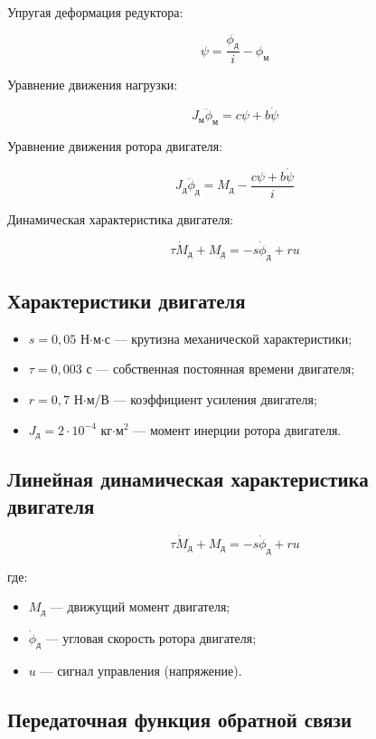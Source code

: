 \documentclass[14pt]{extreport}
\begin{document}
{Упругая деформация редуктора:

\[
\psi = \frac{\phi_{\text{д}}}{i} - \phi_{\text{м}}
\]

Уравнение движения нагрузки:

\[
J_{\text{м}} \ddot{\phi}_{\text{м}} = c \psi + b \dot{\psi}
\]

Уравнение движения ротора двигателя:

\[
J_{\text{д}} \ddot{\phi}_{\text{д}} = M_{\text{д}} - \frac{c \psi + b \dot{\psi}}{i}
\]

Динамическая характеристика двигателя:

\[
\tau \dot{M}_{\text{д}} + M_{\text{д}} = -s \dot{\phi}_{\text{д}} + r u
\]

        \subsection{Характеристики двигателя}
        \begin{itemize}
    \item $s = 0,05$ Н$\cdot$м$\cdot$с --- крутизна механической характеристики;
    \item $\tau = 0,003$ с --- собственная постоянная времени двигателя;
    \item $r = 0,7$ Н$\cdot$м/В --- коэффициент усиления двигателя;
    \item $J_{\text{д}} = 2 \cdot 10^{-4}$ кг$\cdot$м$^2$ --- момент инерции ротора двигателя.
\end{itemize}

\subsection*{Линейная динамическая характеристика двигателя}

\[
\tau \dot{M}_{\text{д}} + M_{\text{д}} = -s \dot{\phi}_{\text{д}} + r u
\]

где:
\begin{itemize}
    \item $M_{\text{д}}$ --- движущий момент двигателя;
    \item $\dot{\phi}_{\text{д}}$ --- угловая скорость ротора двигателя;
    \item $u$ --- сигнал управления (напряжение).
\end{itemize}

       \subsection{Передаточная функция обратной связи}

}
\end{document}
